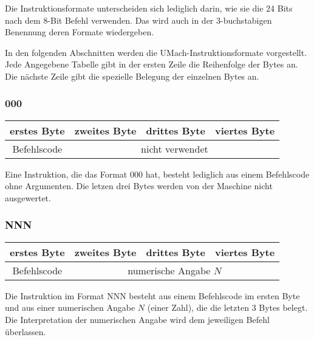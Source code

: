 Die Instruktionsformate unterscheiden sich lediglich darin, wie sie die 24 Bits
nach dem 8-Bit Befehl verwenden. Das wird auch in der 3-buchstabigen
Benennung deren Formate wiedergeben.

In den folgenden Abschnitten werden die UMach-Instruktionsformate vorgestellt.
Jede Angegebene Tabelle gibt in der ersten Zeile die Reihenfolge der Bytes an. 
Die nächste Zeile gibt die spezielle Belegung der einzelnen Bytes an.



\subsubsection{000}
\label{000}

\begin{center}
  \begin{tabular}{|*{4}{c|}} \hline
    erstes Byte & zweites Byte  & drittes Byte  & viertes Byte \\\hline\hline
    Befehlscode & \multicolumn{3}{c|}{nicht verwendet}         \\\hline
  \end{tabular}
\end{center}

Eine Instruktion, die das Format 000 hat, besteht lediglich aus einem
Befehlscode ohne Argumenten. Die letzen drei Bytes werden von der Maschine nicht
ausgewertet.



\subsubsection{NNN}
\label{NNN}

\begin{center}
  \begin{tabular}{|*{4}{c|}}
    \hline
    erstes Byte  & zweites Byte  & drittes Byte  & viertes Byte \\\hline\hline
    Befehlscode  & \multicolumn{3}{c|}{numerische Angabe $N$}   \\\hline
  \end{tabular}
\end{center}

Die Instruktion im Format NNN besteht aus einem Befehlscode im ersten Byte und
aus einer numerischen Angabe  $N$ (einer Zahl), die die letzten 3 Bytes belegt.
Die Interpretation der numerischen Angabe wird dem jeweiligen Befehl überlassen.


